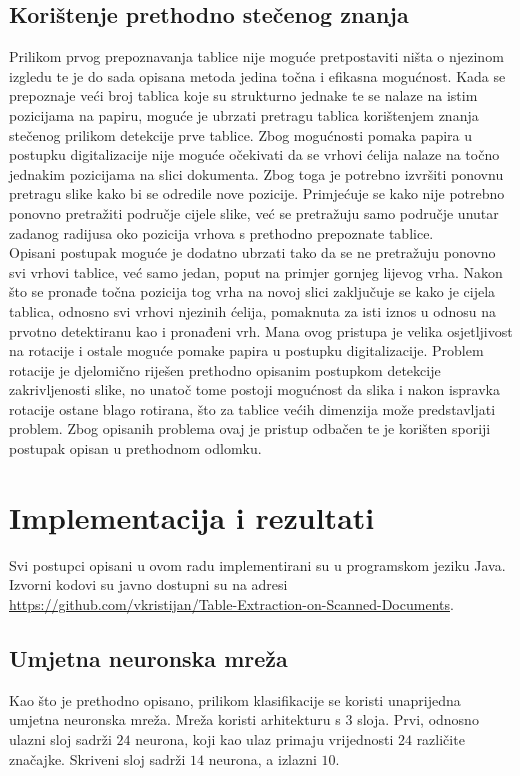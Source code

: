 \documentclass[times, utf8, zavrsni, numeric]{fer}
\begin{document}
\section{Korištenje prethodno stečenog znanja}
Prilikom prvog prepoznavanja tablice nije moguće pretpostaviti ništa o njezinom izgledu te je do sada opisana metoda jedina točna i efikasna mogućnost.
Kada se prepoznaje veći broj tablica koje su strukturno jednake te se nalaze na istim pozicijama na papiru, moguće je ubrzati pretragu tablica korištenjem znanja stečenog prilikom detekcije prve tablice. 
Zbog mogućnosti pomaka papira u postupku digitalizacije nije moguće očekivati da se vrhovi ćelija nalaze na točno jednakim pozicijama na slici dokumenta.
Zbog toga je potrebno izvršiti ponovnu pretragu slike kako bi se odredile nove pozicije.
Primjećuje se kako nije potrebno ponovno pretražiti područje cijele slike, već se pretražuju samo područje unutar zadanog radijusa oko pozicija vrhova s prethodno prepoznate tablice.\\

Opisani postupak moguće je dodatno ubrzati tako da se ne pretražuju ponovno svi vrhovi tablice, već samo jedan, poput na primjer gornjeg lijevog vrha.
Nakon što se pronađe točna pozicija tog vrha na novoj slici zaključuje se kako je cijela tablica, odnosno svi vrhovi njezinih ćelija, pomaknuta za isti iznos u odnosu na prvotno detektiranu kao i pronađeni vrh.
Mana ovog pristupa je velika osjetljivost na rotacije i ostale moguće pomake papira u postupku digitalizacije. 
Problem rotacije je djelomično riješen prethodno opisanim postupkom detekcije zakrivljenosti slike, no unatoč tome postoji mogućnost da slika i nakon ispravka rotacije ostane blago rotirana, što za tablice većih dimenzija može predstavljati problem.
Zbog opisanih problema ovaj je pristup odbačen te je korišten sporiji postupak opisan u prethodnom odlomku.


\chapter{Implementacija i rezultati} 
\label{ch:implementation}
Svi postupci opisani u ovom radu implementirani su u programskom jeziku Java.
Izvorni kodovi su javno dostupni su na adresi \href{https://github.com/vkristijan/Table-Extraction-on-Scanned-Documents}{https://github.com/vkristijan/Table-Extraction-on-Scanned-Documents}.

\section{Umjetna neuronska mreža}
Kao što je prethodno opisano, prilikom klasifikacije se koristi unaprijedna umjetna neuronska mreža. 
Mreža koristi arhitekturu s $3$ sloja.
Prvi, odnosno ulazni sloj sadrži $24$ neurona, koji kao ulaz primaju vrijednosti $24$ različite značajke.
Skriveni sloj sadrži $14$ neurona, a izlazni $10$.\\
\end{document}
